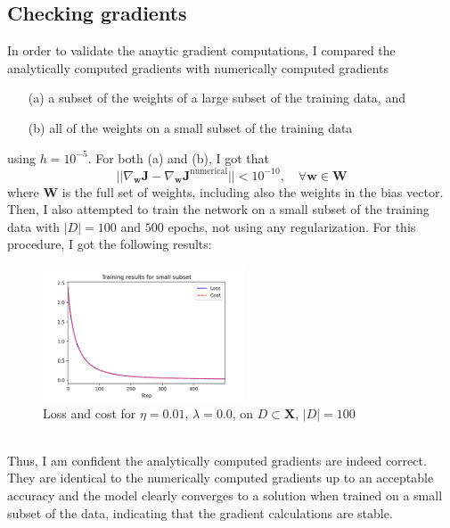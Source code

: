 \documentclass{article}
\begin{document}
\newpage

\subsection*{Checking gradients}

	In order to validate the anaytic gradient computations, I compared the analytically computed gradients with numerically computed gradients
	\begin{itemize}
		\item[(a)] a subset of the weights of a large subset of the training data, and
		\item[(b)] all of the weights on a small subset of the training data
	\end{itemize}
	using $h = 10^{-5}$.  For both (a) and (b), I got that
	$$\vert\vert \nabla_{\bm{w}} \bm{J} - \nabla_{\bm{w}} \bm{J}^{\text{numerical}} \vert\vert < 10^{-10}, \quad \forall\bm{w} \in \bm{W}$$
	where $\bm{W}$ is the full set of weights, including also the weights in the bias vector. Then, I also attempted to train the network on a small subset of the training data with $\vert D\vert = 100$ and $500$ epochs, not using any regularization. For this procedure, I got the following results:
	\begin{figure}[h!]
		\centering
		\includegraphics[width=6cm]{../plots/grad_test.png}
		\caption{Loss and cost for $\eta=0.01$, $\lambda=0.0$, on $D\subset \bm{X}$, $\vert D\vert = 100$}
	\end{figure}\\
	Thus, I am confident the analytically computed gradients are indeed correct. They are identical to the numerically computed gradients up to an acceptable accuracy and the model clearly converges to a solution when trained on a small subset of the data, indicating that the gradient calculations are stable.
\end{document}
